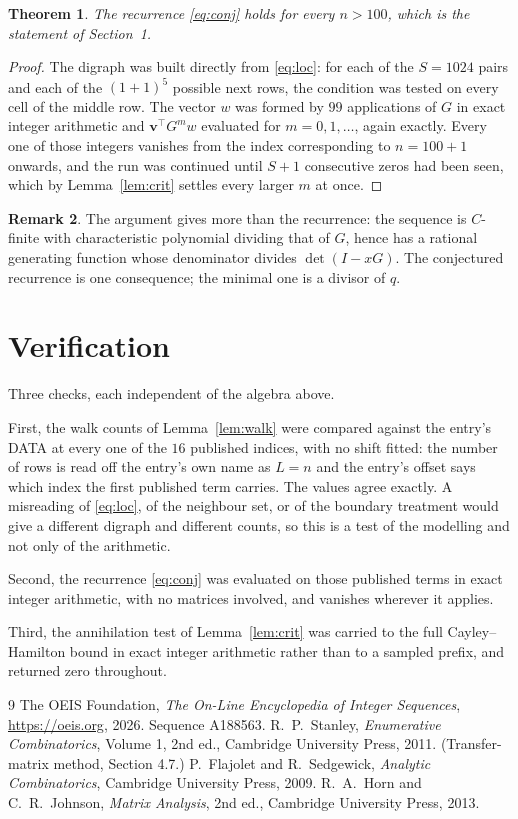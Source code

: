 \documentclass[11pt,a4paper]{article}
\theoremstyle{plain}
\newtheorem{theorem}{Theorem}
\theoremstyle{definition}
\newtheorem{remark}[theorem]{Remark}
\begin{document}
\begin{theorem}
The recurrence \eqref{eq:conj} holds for every $n>100$, which is the statement of
Section~1.
\end{theorem}

\begin{proof}
The digraph was built directly from \eqref{eq:loc}: for each of the $S=1024$ pairs and each
of the $(1+1)^{5}$ possible next rows, the condition was tested on every cell of
the middle row. The vector $w$ was formed by $99$ applications of $G$ in exact integer
arithmetic and $\mathbf{v}^{\!\top}G^{m}w$ evaluated for $m=0,1,\dots$, again exactly.
Every one of those integers vanishes from the index corresponding to $n=100+1$ onwards,
and the run was continued until $S+1$ consecutive zeros had been seen, which by
Lemma~\ref{lem:crit} settles every larger $m$ at once.
\end{proof}

\begin{remark}
The argument gives more than the recurrence: the sequence is $C$-finite with characteristic
polynomial dividing that of $G$, hence has a rational generating function whose denominator
divides $\det(I-xG)$. The conjectured recurrence is one consequence; the minimal one is a
divisor of $q$.
\end{remark}

\section{Verification}

Three checks, each independent of the algebra above.

First, the walk counts of Lemma~\ref{lem:walk} were compared against the entry's DATA at
every one of the $16$ published indices, with no shift fitted: the number of rows is
read off the entry's own name as $L=n$ and the entry's offset says which index the first
published term carries. The values agree exactly. A misreading of \eqref{eq:loc}, of the
neighbour set, or of the boundary treatment would give a different digraph and different
counts, so this is a test of the modelling and not only of the arithmetic.

Second, the recurrence \eqref{eq:conj} was evaluated on those published terms in exact
integer arithmetic, with no matrices involved, and vanishes wherever it applies.

Third, the annihilation test of Lemma~\ref{lem:crit} was carried to the full
Cayley--Hamilton bound in exact integer arithmetic rather than to a sampled prefix, and
returned zero throughout.

\begin{thebibliography}{9}
 The OEIS Foundation, \emph{The On-Line Encyclopedia of Integer
Sequences}, \url{https://oeis.org}, 2026. Sequence A188563.
 R.~P.~Stanley, \emph{Enumerative Combinatorics}, Volume 1, 2nd ed.,
Cambridge University Press, 2011. (Transfer-matrix method, Section 4.7.)
 P.~Flajolet and R.~Sedgewick, \emph{Analytic Combinatorics}, Cambridge
University Press, 2009.
 R.~A.~Horn and C.~R.~Johnson, \emph{Matrix Analysis}, 2nd ed., Cambridge
University Press, 2013.
\end{thebibliography}
\end{document}
